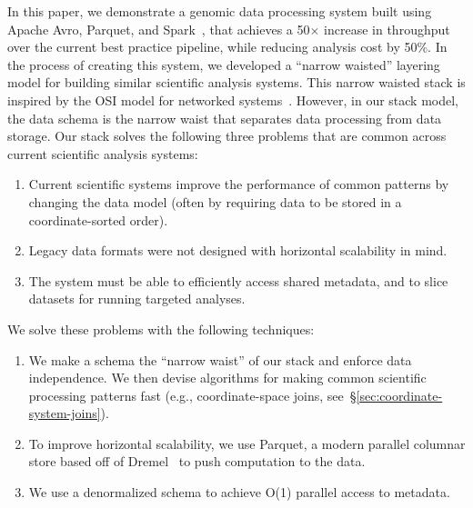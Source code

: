 \documentclass[10pt]{report} %
\begin{document}
In this paper, we demonstrate a genomic data processing system built using Apache Avro, Parquet, and
Spark~\cite{avro, parquet, zaharia10}, that achieves a 50$\times$ increase in throughput over the current best
practice pipeline, while reducing analysis cost by 50\%. In the process of creating this
system, we developed a ``narrow waisted'' layering model for building similar scientific analysis systems.
This narrow waisted stack is inspired by the OSI model for networked systems~\cite{zimmermann80}.
However, in our stack model, the data schema is the narrow waist that separates data processing from
data storage. Our stack solves the following three problems that are common across current scientific
analysis systems:

\begin{enumerate}
\item Current scientific systems improve the performance of common patterns by changing the data
model (often by requiring data to be stored in a coordinate-sorted order).
\item Legacy data formats were not designed with horizontal scalability in mind.
\item The system must be able to efficiently access shared metadata, and to slice datasets for running
targeted analyses.
\end{enumerate}

We solve these problems with the following techniques:

\begin{enumerate}
\item We make a schema the ``narrow waist'' of our stack and enforce data independence. We then
devise algorithms for making common scientific processing patterns fast (e.g., coordinate-space joins,
see~\S\ref{sec:coordinate-system-joins}).
\item To improve horizontal scalability, we use Parquet, a modern parallel columnar store based off of
Dremel~\cite{melnik10} to push computation to the data.
\item We use a denormalized schema to achieve O(1) parallel access to metadata.
\end{enumerate}
\end{document}
